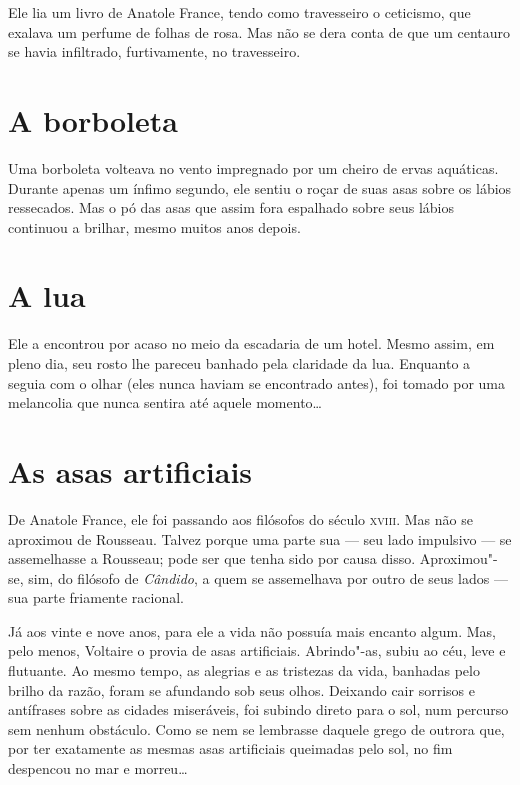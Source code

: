 Ele lia um livro de Anatole France, tendo como travesseiro o ceticismo,
que exalava um perfume de folhas de rosa. Mas não se dera conta de que
um centauro se havia infiltrado, furtivamente, no travesseiro.

\section{A borboleta}

Uma borboleta volteava no vento impregnado por um cheiro de ervas
aquáticas. Durante apenas um ínfimo segundo, ele sentiu o roçar de suas
asas sobre os lábios ressecados. Mas o pó das asas que assim fora
espalhado sobre seus lábios continuou a brilhar, mesmo muitos anos
depois.

\section{A lua}

Ele a encontrou por acaso no meio da escadaria de um hotel. Mesmo assim,
em pleno dia, seu rosto lhe pareceu banhado pela claridade da lua.
Enquanto a seguia com o olhar (eles nunca haviam se encontrado antes),
foi tomado por uma melancolia que nunca sentira até aquele momento\ldots{}

\section{As asas artificiais}

De Anatole France, ele foi passando aos filósofos do século \textsc{xviii}. Mas
não se aproximou de Rousseau. Talvez porque uma parte sua --- seu lado
impulsivo --- se assemelhasse a Rousseau; pode ser que tenha sido por
causa disso. Aproximou"-se, sim, do filósofo de \textit{Cândido}, a quem
se assemelhava por outro de seus lados --- sua parte friamente racional.

Já aos vinte e nove anos, para ele a vida não possuía mais encanto
algum. Mas, pelo menos, Voltaire o provia de asas artificiais.
Abrindo"-as, subiu ao céu, leve e flutuante. Ao mesmo tempo, as alegrias
e as tristezas da vida, banhadas pelo brilho da razão, foram se
afundando sob seus olhos. Deixando cair sorrisos e antífrases sobre as
cidades miseráveis, foi subindo direto para o sol, num percurso sem
nenhum obstáculo. Como se nem se lembrasse daquele grego de outrora
que, por ter exatamente as mesmas asas artificiais queimadas pelo sol,
no fim despencou no mar e morreu\ldots{}

